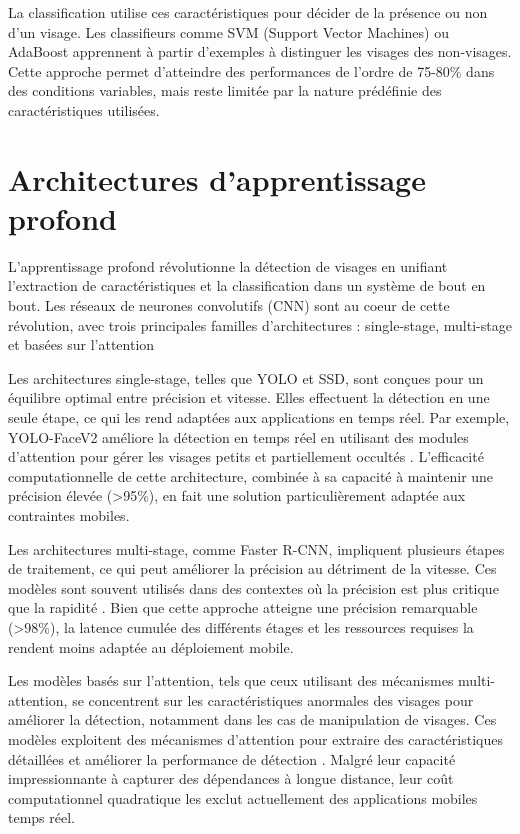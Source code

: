 \begin{onehalfspace}
\hspace{0.65cm} La classification utilise ces caractéristiques pour décider de la présence ou non d'un visage. Les classifieurs comme SVM (Support Vector Machines) ou AdaBoost apprennent à partir d'exemples à distinguer les visages des non-visages. Cette approche permet d'atteindre des performances de l'ordre de 75-80\% dans des conditions variables, mais reste limitée par la nature prédéfinie des caractéristiques utilisées.


\section{Architectures d'apprentissage profond}
\hspace{0.65cm} L'apprentissage profond révolutionne la détection de visages en unifiant l'extraction de caractéristiques et la classification dans un système de bout en bout. Les réseaux de neurones convolutifs (CNN) sont au coeur de cette révolution, avec trois principales familles d'architectures : single-stage, multi-stage et basées sur l'attention

\hspace{0.65cm} Les architectures single-stage, telles que YOLO et SSD, sont conçues pour un équilibre optimal entre précision et vitesse. Elles effectuent la détection en une seule étape, ce qui les rend adaptées aux applications en temps réel. Par exemple, YOLO-FaceV2 améliore la détection en temps réel en utilisant des modules d'attention pour gérer les visages petits et partiellement occultés \cite{yu2022yolofacev2scaleocclusionaware}. L'efficacité computationnelle de cette architecture, combinée à sa capacité à maintenir une précision élevée (>95\%), en fait une solution particulièrement adaptée aux contraintes mobiles.

\hspace{0.65cm}Les architectures multi-stage, comme Faster R-CNN, impliquent plusieurs étapes de traitement, ce qui peut améliorer la précision au détriment de la vitesse. Ces modèles sont souvent utilisés dans des contextes où la précision est plus critique que la rapidité \cite{186Текстстатті46511020230930}. Bien que cette approche atteigne une précision remarquable (>98\%), la latence cumulée des différents étages et les ressources requises la rendent moins adaptée au déploiement mobile.

\hspace{0.65cm} Les modèles basés sur l'attention, tels que ceux utilisant des mécanismes multi-attention, se concentrent sur les caractéristiques anormales des visages pour améliorer la détection, notamment dans les cas de manipulation de visages. Ces modèles exploitent des mécanismes d'attention pour extraire des caractéristiques détaillées et améliorer la performance de détection \cite{Cao2021Face}. Malgré leur capacité impressionnante à capturer des dépendances à longue distance, leur coût computationnel quadratique les exclut actuellement des applications mobiles temps réel.


\end{onehalfspace}
